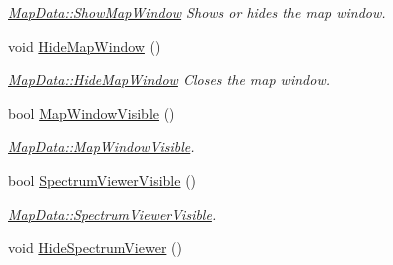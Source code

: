 \begin{DoxyCompactItemize}
\begin{DoxyCompactList}\small\item\em \hyperlink{class_map_data_ad93b4a05e79ca14e075d7991fce4b5cd}{Map\+Data\+::\+Show\+Map\+Window} Shows or hides the map window. \end{DoxyCompactList}\item 
\hypertarget{class_map_data_a3a4fab7a7f8862cab5f3fb9df19d41b5}{void \hyperlink{class_map_data_a3a4fab7a7f8862cab5f3fb9df19d41b5}{Hide\+Map\+Window} ()}\label{class_map_data_a3a4fab7a7f8862cab5f3fb9df19d41b5}

\begin{DoxyCompactList}\small\item\em \hyperlink{class_map_data_a3a4fab7a7f8862cab5f3fb9df19d41b5}{Map\+Data\+::\+Hide\+Map\+Window} Closes the map window. \end{DoxyCompactList}\item 
bool \hyperlink{class_map_data_aef9546998544f313097d1510b1d2316f}{Map\+Window\+Visible} ()
\begin{DoxyCompactList}\small\item\em \hyperlink{class_map_data_aef9546998544f313097d1510b1d2316f}{Map\+Data\+::\+Map\+Window\+Visible}. \end{DoxyCompactList}\item 
bool \hyperlink{class_map_data_ac0606ccd229f86320f5f08838d4d96db}{Spectrum\+Viewer\+Visible} ()
\begin{DoxyCompactList}\small\item\em \hyperlink{class_map_data_ac0606ccd229f86320f5f08838d4d96db}{Map\+Data\+::\+Spectrum\+Viewer\+Visible}. \end{DoxyCompactList}\item 
\hypertarget{class_map_data_a61f4104e14f8b8e0d1a51872412737e1}{void \hyperlink{class_map_data_a61f4104e14f8b8e0d1a51872412737e1}{Hide\+Spectrum\+Viewer} ()}\label{class_map_data_a61f4104e14f8b8e0d1a51872412737e1}


\end{DoxyCompactItemize}
